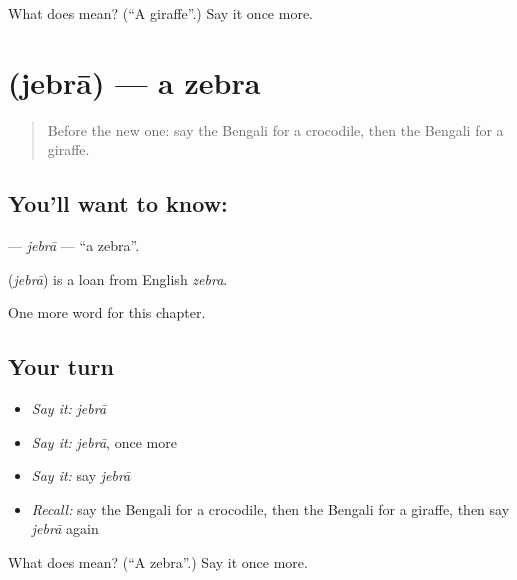 \begin{tcolorbox}[breakable,colback=teal!4,colframe=teal!35!black,title={Before you move on}]
What does  mean? (\textquotedblleft{}A giraffe\textquotedblright{}.) Say it once more.
\end{tcolorbox}
\section[\texorpdfstring{\bn{জেব্রা} (jebrā)}{জেব্রা (jebrā)}]{ (jebrā) — a zebra}

\label{lesson:BN-C250-jebra}



\begin{quote}
Before the new one: say the Bengali for a crocodile, then the Bengali for a giraffe.
\end{quote}

\subsection*{You'll want to know: }
\textbf{} — \emph{jebrā} — \textquotedblleft{}a zebra\textquotedblright{}.

\begin{cousinweb}
\textbf{} (\emph{jebrā}) is a loan from English \emph{zebra}.
\end{cousinweb}

\begin{grammarlens}[title={What you've built}]
One more word for this chapter.
\end{grammarlens}

\subsection*{Your turn}
\begin{itemize}
\raggedright
  \item \emph{Say it:} \emph{jebrā}
  \item \emph{Say it:} \emph{jebrā}, once more
  \item \emph{Say it:} say \emph{jebrā}
  \item \emph{Recall:} say the Bengali for a crocodile, then the Bengali for a giraffe, then say \emph{jebrā} again
\end{itemize}

\begin{tcolorbox}[breakable,colback=teal!4,colframe=teal!35!black,title={Before you move on}]
What does  mean? (\textquotedblleft{}A zebra\textquotedblright{}.) Say it once more.
\end{tcolorbox}
